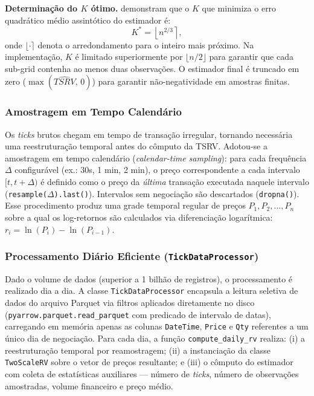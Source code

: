 \textbf{Determinação do $K$ ótimo.}  demonstram que o $K$ que minimiza o erro quadrático médio assintótico do estimador é:
%
\begin{equation}
    \label{eq:k_otimo}
    K^* = \left\lfloor n^{2/3} \right\rceil,
\end{equation}
%
onde $\lfloor\cdot\rceil$ denota o arredondamento para o inteiro mais próximo. Na implementação, $K$ é limitado superiormente por $\lfloor n/2 \rfloor$ para garantir que cada sub-grid contenha ao menos duas observações. O estimador final é truncado em zero ($\max(\widehat{TSRV},\,0)$) para garantir não-negatividade em amostras finitas.

\subsubsection{Amostragem em Tempo Calendário}
\label{subsubsec:amostragem_calendario}

Os \emph{ticks} brutos chegam em tempo de transação irregular, tornando necessária uma reestruturação temporal antes do cômputo da TSRV. Adotou-se a amostragem em tempo calendário (\emph{calendar-time sampling}): para cada frequência $\Delta$ configurável (ex.: 30s, 1 min, 2 min), o preço correspondente a cada intervalo $[t, t+\Delta)$ é definido como o preço da \emph{última} transação executada naquele intervalo (\texttt{resample($\Delta$).last()}). Intervalos sem negociação são descartados (\texttt{dropna()}). Esse procedimento produz uma grade temporal regular de preços $P_1, P_2, \ldots, P_n$ sobre a qual os log-retornos são calculados via diferenciação logarítmica: $r_i = \ln(P_i) - \ln(P_{i-1})$.

\subsubsection{Processamento Diário Eficiente (\texttt{TickDataProcessor})}
\label{subsubsec:tick_processor}

Dado o volume de dados (superior a 1 bilhão de registros), o processamento é realizado dia a dia. A classe \texttt{TickDataProcessor} encapsula a leitura seletiva de dados do arquivo Parquet via filtros aplicados diretamente no disco (\texttt{pyarrow.parquet.read\_parquet} com predicado de intervalo de datas), carregando em memória apenas as colunas \texttt{DateTime}, \texttt{Price} e \texttt{Qty} referentes a um único dia de negociação. Para cada dia, a função \texttt{compute\_daily\_rv} realiza: (i) a reestruturação temporal por reamostragem; (ii) a instanciação da classe \texttt{TwoScaleRV} sobre o vetor de preços resultante; e (iii) o cômputo do estimador com coleta de estatísticas auxiliares --- número de \emph{ticks}, número de observações amostradas, volume financeiro e preço médio.

